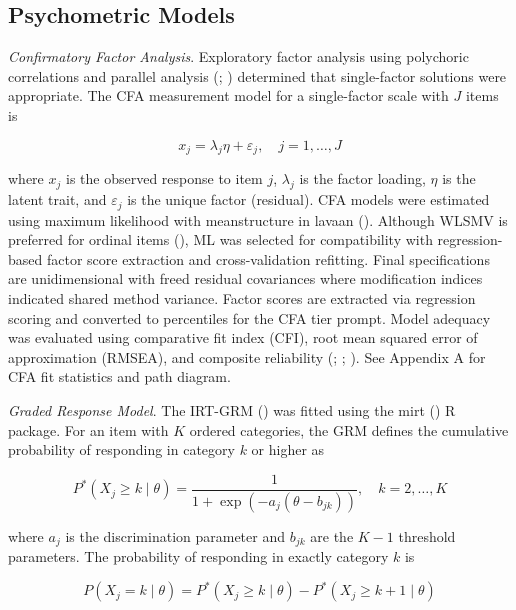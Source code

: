 \documentclass[
  man,
  floatsintext,
  longtable,
  nolmodern,
  notxfonts,
  notimes,
  colorlinks=true,linkcolor=blue,citecolor=blue,urlcolor=blue]{apa7}
\begin{document}
\subsection{Psychometric Models}\label{psychometric-models}

\emph{Confirmatory Factor Analysis}. Exploratory factor analysis using
polychoric correlations and parallel analysis
(;
) determined that single-factor
solutions were appropriate. The CFA measurement model for a
single-factor scale with \(J\) items is

\[x_j = \lambda_j \eta + \varepsilon_j, \quad j = 1, \ldots, J\]

where \(x_j\) is the observed response to item \(j\), \(\lambda_j\) is
the factor loading, \(\eta\) is the latent trait, and \(\varepsilon_j\)
is the unique factor (residual). CFA models were estimated using maximum
likelihood with meanstructure in lavaan
(). Although WLSMV is preferred
for ordinal items (), ML
was selected for compatibility with regression-based factor score
extraction and cross-validation refitting. Final specifications are
unidimensional with freed residual covariances where modification
indices indicated shared method variance. Factor scores are extracted
via regression scoring and converted to percentiles for the CFA tier
prompt. Model adequacy was evaluated using comparative fit index (CFI),
root mean squared error of approximation (RMSEA), and composite
reliability (;
;
). See Appendix A for CFA fit
statistics and path diagram.

\emph{Graded Response Model}. The IRT-GRM
() was fitted using the mirt
() R package. For an item
with \(K\) ordered categories, the GRM defines the cumulative
probability of responding in category \(k\) or higher as

\[P^*(X_j \geq k \mid \theta) = \frac{1}{1 + \exp\left(-a_j(\theta - b_{jk})\right)}, \quad k = 2, \ldots, K\]

where \(a_j\) is the discrimination parameter and \(b_{jk}\) are the
\(K - 1\) threshold parameters. The probability of responding in exactly
category \(k\) is

\[P(X_j = k \mid \theta) = P^*(X_j \geq k \mid \theta) - P^*(X_j \geq k + 1 \mid \theta)\]
\end{document}
